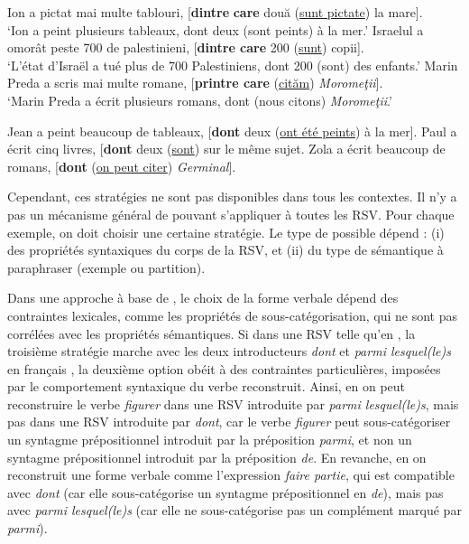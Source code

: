 \ea \label{ch3:ex86}
\ea 
Ion a pictat mai multe tablouri, [\textbf{dintre} \textbf{care} două (\uline{sunt pictate}) la mare]. \label{ch3:ex86a}\\
\glt ‘Ion a peint plusieurs tableaux, dont deux (sont peints) à la mer.’
\ex 
Israelul a omorât peste 700 de palestinieni, [\textbf{dintre care} 200 (\uline{sunt}) copii]. \label{ch3:ex86b}\\
\glt ‘L’état d’Israël a tué plus de 700 Palestiniens, dont 200 (sont) des enfants.’
\ex 
Marin Preda a scris mai multe romane, [\textbf{printre care} (\uline{cităm}) \textit{Moromeţii}]. \label{ch3:ex86c}\\
\glt ‘Marin Preda a écrit plusieurs romans, dont (nous citons) \textit{Moromeţii}.’
\z 
\z

\ea \label{ch3:ex87}
\ea 
Jean a peint beaucoup de tableaux, [\textbf{dont} deux (\uline{ont été peints}) à la mer]. \label{ch3:ex87a}
\ex
Paul a écrit cinq livres, [\textbf{dont} deux (\uline{sont}) sur le même sujet. \label{ch3:ex87b}
\ex 
Zola a écrit beaucoup de romans, [\textbf{dont} (\uline{on peut citer}) \textit{Germinal}]. \label{ch3:ex87c}
\z 
\z

Cependant, ces stratégies ne sont pas disponibles dans tous les contextes. Il n’y a pas un mécanisme général de  pouvant s’appliquer à toutes les RSV. Pour chaque exemple, on doit choisir une certaine stratégie. Le type de  possible dépend : (i) des propriétés syntaxiques du corps de la RSV, et (ii) du type de sémantique à paraphraser (exemple ou partition). 

Dans une approche à base de , le choix de la forme verbale dépend des contraintes lexicales, comme les propriétés de sous-catégori\-sation, qui ne sont pas corrélées avec les propriétés sémantiques. Si dans une RSV telle qu'en , la troisième stratégie marche avec les deux introducteurs \textit{dont} et \textit{parmi lesquel(le)s} en français , la deuxième option obéit à des contraintes particulières, imposées par le comportement syntaxique du verbe reconstruit. Ainsi, en  on peut reconstruire le verbe \textit{figurer} dans une RSV introduite par \textit{parmi lesquel(le)s}, mais pas dans une RSV introduite par \textit{dont}, car le verbe \textit{figurer} peut sous-catégoriser un syntagme prépositionnel introduit par la préposition \textit{parmi}, et non un syntagme prépositionnel introduit par la préposition \textit{de}. En revanche, en  on reconstruit une forme verbale comme l’expression \textit{faire partie}, qui est compatible avec \textit{dont} (car elle sous-catégorise un syntagme prépositionnel en \textit{de}), mais pas avec \textit{parmi lesquel(le)s} (car elle ne sous-catégorise pas un complément marqué par \textit{parmi}).

